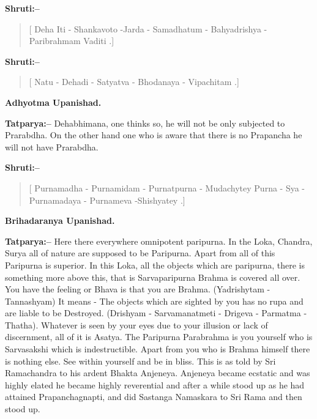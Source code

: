 \textbf{Shruti:–}

\begin{verse}
[ Deha Iti - Shankavoto -Jarda - Samadhatum - Bahyadrishya - Paribrahmam Vaditi .]
\end{verse}

\textbf{Shruti:–}

\begin{verse}
[ Natu - Dehadi - Satyatva - Bhodanaya - Vipachitam .]
\end{verse}

\begin{flushright}
\textbf{Adhyotma Upanishad.}
\end{flushright}

\textbf{Tatparya:–} Dehabhimana, one thinks so, he will not be only subjected to Prarabdha. On the other hand one who is aware that there is no Prapancha he will not have Prarabdha.

\textbf{Shruti:–}

\begin{verse}
[ Purnamadha - Purnamidam - Purnatpurna - Muda\break chytey  Purna - Sya - Purnamadaya - Purnameva -\break Shishyatey .]
\end{verse}

\begin{flushright}
\textbf{Brihadaranya Upanishad.}
\end{flushright}

\textbf{Tatparya:–} Here there everywhere omnipotent paripurna. In the Loka, Chandra, Surya all of nature are supposed to be Paripurna. Apart from all of this Paripurna is superior. In this Loka, all the objects which are paripurna, there is something more above this, that is Sarvaparipurna Brahma is covered all over. You have the feeling or Bhava is that you are Brahma. (Yadrishytam - Tannashyam) It means - The objects which are sighted by you has no rupa and are liable to be Destroyed. (Drishyam - Sarvamanatmeti - Drigeva - Parmatma - Thatha). Whatever is seen by your eyes due to your illusion or lack of discernment, all of it is Asatya. The Paripurna Parabrahma is you yourself who is Sarvasakshi which is indestructible. Apart from you who is Brahma himself there is nothing else. See within yourself and be in bliss. This is as told by Sri Ramachandra to his ardent Bhakta Anjeneya. Anjeneya became ecstatic and was highly elated he became highly reverential and after a while stood up as he had attained Prapanchagnapti, and did Sastanga Namaskara to Sri Rama and then stood up.

